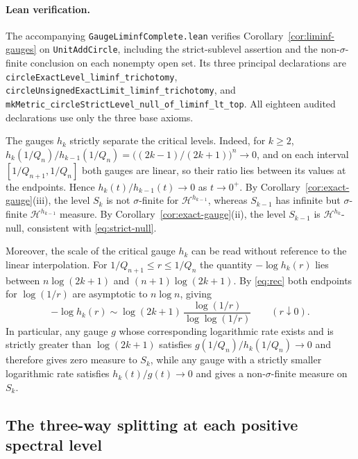 \paragraph{Lean verification.}
The accompanying \texttt{GaugeLiminfComplete.lean} verifies
Corollary~\ref{cor:liminf-gauges} on \texttt{UnitAddCircle}, including
the strict-sublevel assertion and the non-$\sigma$-finite conclusion on
each nonempty open set. Its three principal declarations are
\texttt{circleExactLevel\_\allowbreak liminf\_\allowbreak trichotomy},
\texttt{circleUnsigned\allowbreak ExactLimit\_\allowbreak liminf\_\allowbreak trichotomy}, and
\texttt{mkMetric\_\allowbreak circleStrictLevel\_\allowbreak null\_\allowbreak of\_\allowbreak liminf\_\allowbreak lt\_\allowbreak top}.
All eighteen audited declarations use only the three base axioms.

\begin{remark}\label{rem:gauge-scale}
The gauges $h_k$ strictly separate the critical levels. Indeed, for $k\ge2$,
$h_k(1/Q_n)/h_{k-1}(1/Q_n)=\bigl((2k-1)/(2k+1)\bigr)^n\to0$, and on each
interval $[1/Q_{n+1},1/Q_n]$ both gauges are linear, so their ratio lies
between its values at the endpoints. Hence $h_k(t)/h_{k-1}(t)\to0$ as
$t\to0^+$. By Corollary~\ref{cor:exact-gauge}(iii), the level $S_k$ is not
$\sigma$-finite for $\mathcal H^{h_{k-1}}$, whereas $S_{k-1}$ has infinite
but $\sigma$-finite $\mathcal H^{h_{k-1}}$ measure. By
Corollary~\ref{cor:exact-gauge}(ii), the level $S_{k-1}$ is
$\mathcal H^{h_k}$-null, consistent with \eqref{eq:strict-null}.

Moreover, the scale of the critical gauge $h_k$ can be read without reference
to the linear interpolation. For $1/Q_{n+1}\le r\le1/Q_n$ the quantity
$-\log h_k(r)$ lies between $n\log(2k+1)$ and $(n+1)\log(2k+1)$.
By \eqref{eq:rec} both endpoints for $\log(1/r)$ are asymptotic to
$n\log n$, giving
\[
 -\log h_k(r)\sim \log(2k+1)\,
             \frac{\log(1/r)}{\log\log(1/r)}\qquad(r\downarrow0).
\]
In particular, any gauge $g$ whose corresponding logarithmic rate exists and is
strictly greater than $\log(2k+1)$ satisfies $g(1/Q_n)/h_k(1/Q_n)\to0$ and
therefore gives zero measure to $S_k$, while any gauge with a strictly smaller
logarithmic rate satisfies $h_k(t)/g(t)\to0$ and gives a non-$\sigma$-finite
measure on $S_k$.
\end{remark}

\subsection{The three-way splitting at each positive spectral level}

